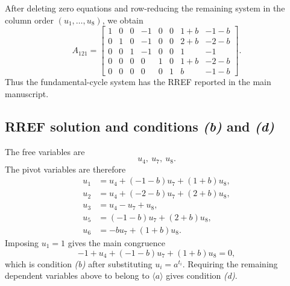 \documentclass[11pt]{article}
\newcommand{\SpanA}{\langle a\rangle}
\begin{document}
After deleting zero equations and row-reducing the remaining system in the column order $(u_1,\ldots,u_8)$, we obtain
\[
A_{121}=
\begin{bmatrix}
1 & 0 & 0 & -1 & 0 & 0 & 1 + b & -1 - b \\
0 & 1 & 0 & -1 & 0 & 0 & 2 + b & -2 - b \\
0 & 0 & 1 & -1 & 0 & 0 & 1 & -1 \\
0 & 0 & 0 & 0 & 1 & 0 & 1 + b & -2 - b \\
0 & 0 & 0 & 0 & 0 & 1 & b & -1 - b
\end{bmatrix}.
\]
Thus the fundamental-cycle system has the RREF reported in the main manuscript.

\subsection{RREF solution and conditions \emph{(b)} and \emph{(d)}}
The free variables are
\[
u_{4},\ u_{7},\ u_{8}.
\]
The pivot variables are therefore
\[
\begin{aligned}
u_{1}&=u_{4} + \left(-1 - b\right)u_{7} + \left(1 + b\right)u_{8},\\
u_{2}&=u_{4} + \left(-2 - b\right)u_{7} + \left(2 + b\right)u_{8},\\
u_{3}&=u_{4} - u_{7} + u_{8},\\
u_{5}&=\left(-1 - b\right)u_{7} + \left(2 + b\right)u_{8},\\
u_{6}&=-bu_{7} + \left(1 + b\right)u_{8}.
\end{aligned}
\]
Imposing $u_1=1$ gives the main congruence
\[
-1 + u_{4} + \left(-1 - b\right)u_{7} + \left(1 + b\right)u_{8}=0,
\]
which is condition \emph{(b)} after substituting $u_i=a^{t_i}$.  Requiring the remaining dependent variables above to belong to $\SpanA$ gives condition \emph{(d)}.
\end{document}
